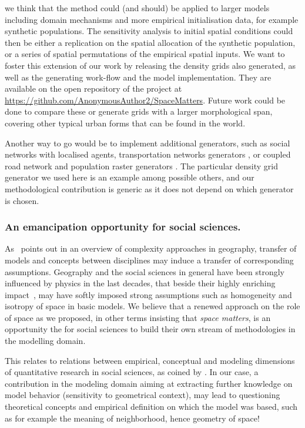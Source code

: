 \documentclass{JASSS}
\begin{document}
we think that the method could (and should) be applied to larger models including domain mechanisms and more empirical initialisation data, for example synthetic populations. The sensitivity analysis to initial spatial conditions could then be either a replication on the spatial allocation of the synthetic population, or a series of spatial permutations of the empirical spatial inputs.
We want to foster this extension of our work by releasing the density grids also generated, as well as the generating work-flow and the model implementation. They are available on the open repository of the project at \url{https://github.com/AnonymousAuthor2/SpaceMatters}. Future work could be done to compare these or generate grids with a larger morphological span, covering other typical urban forms that can be found in the world.

Another way to go would be to implement additional generators, such as social networks \citep{alizadeh2016generating} with localised agents, transportation networks generators \citep{raimbault2018multi}, or coupled road network and population raster generators \citep{raimbault2019urban}. The particular density grid generator we used here is an example among possible others, and our methodological contribution is generic as it does not depend on which generator is chosen.  


\subsubsection{An emancipation opportunity for social sciences.}


As~\citet{pumain2003approche} points out in an overview of complexity approaches in geography, transfer of models and concepts between disciplines may induce a transfer of corresponding assumptions. Geography and the social sciences in general have been strongly influenced by physics in the last decades, that beside their highly enriching impact~\citep{o2015physicists}, may have softly imposed strong assumptions such as homogeneity and isotropy of space in basic models. We believe that a renewed approach on the role of space as we proposed, in other terms insisting that \emph{space matters}, is an opportunity the for social sciences to build their own stream of methodologies in the modelling domain.

This relates to relations between empirical, conceptual and modeling dimensions of quantitative research in social sciences, as coined by \cite{livet2010ontology}. In our case, a contribution in the modeling domain aiming at extracting further knowledge on model behavior (sensitivity to geometrical context), may lead to questioning theoretical concepts and empirical definition on which the model was based, such as for example the meaning of neighborhood, hence geometry of space!
\end{document}
